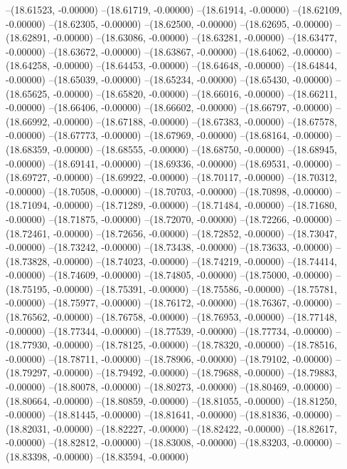 --(18.61523, -0.00000)
--(18.61719, -0.00000)
--(18.61914, -0.00000)
--(18.62109, -0.00000)
--(18.62305, -0.00000)
--(18.62500, -0.00000)
--(18.62695, -0.00000)
--(18.62891, -0.00000)
--(18.63086, -0.00000)
--(18.63281, -0.00000)
--(18.63477, -0.00000)
--(18.63672, -0.00000)
--(18.63867, -0.00000)
--(18.64062, -0.00000)
--(18.64258, -0.00000)
--(18.64453, -0.00000)
--(18.64648, -0.00000)
--(18.64844, -0.00000)
--(18.65039, -0.00000)
--(18.65234, -0.00000)
--(18.65430, -0.00000)
--(18.65625, -0.00000)
--(18.65820, -0.00000)
--(18.66016, -0.00000)
--(18.66211, -0.00000)
--(18.66406, -0.00000)
--(18.66602, -0.00000)
--(18.66797, -0.00000)
--(18.66992, -0.00000)
--(18.67188, -0.00000)
--(18.67383, -0.00000)
--(18.67578, -0.00000)
--(18.67773, -0.00000)
--(18.67969, -0.00000)
--(18.68164, -0.00000)
--(18.68359, -0.00000)
--(18.68555, -0.00000)
--(18.68750, -0.00000)
--(18.68945, -0.00000)
--(18.69141, -0.00000)
--(18.69336, -0.00000)
--(18.69531, -0.00000)
--(18.69727, -0.00000)
--(18.69922, -0.00000)
--(18.70117, -0.00000)
--(18.70312, -0.00000)
--(18.70508, -0.00000)
--(18.70703, -0.00000)
--(18.70898, -0.00000)
--(18.71094, -0.00000)
--(18.71289, -0.00000)
--(18.71484, -0.00000)
--(18.71680, -0.00000)
--(18.71875, -0.00000)
--(18.72070, -0.00000)
--(18.72266, -0.00000)
--(18.72461, -0.00000)
--(18.72656, -0.00000)
--(18.72852, -0.00000)
--(18.73047, -0.00000)
--(18.73242, -0.00000)
--(18.73438, -0.00000)
--(18.73633, -0.00000)
--(18.73828, -0.00000)
--(18.74023, -0.00000)
--(18.74219, -0.00000)
--(18.74414, -0.00000)
--(18.74609, -0.00000)
--(18.74805, -0.00000)
--(18.75000, -0.00000)
--(18.75195, -0.00000)
--(18.75391, -0.00000)
--(18.75586, -0.00000)
--(18.75781, -0.00000)
--(18.75977, -0.00000)
--(18.76172, -0.00000)
--(18.76367, -0.00000)
--(18.76562, -0.00000)
--(18.76758, -0.00000)
--(18.76953, -0.00000)
--(18.77148, -0.00000)
--(18.77344, -0.00000)
--(18.77539, -0.00000)
--(18.77734, -0.00000)
--(18.77930, -0.00000)
--(18.78125, -0.00000)
--(18.78320, -0.00000)
--(18.78516, -0.00000)
--(18.78711, -0.00000)
--(18.78906, -0.00000)
--(18.79102, -0.00000)
--(18.79297, -0.00000)
--(18.79492, -0.00000)
--(18.79688, -0.00000)
--(18.79883, -0.00000)
--(18.80078, -0.00000)
--(18.80273, -0.00000)
--(18.80469, -0.00000)
--(18.80664, -0.00000)
--(18.80859, -0.00000)
--(18.81055, -0.00000)
--(18.81250, -0.00000)
--(18.81445, -0.00000)
--(18.81641, -0.00000)
--(18.81836, -0.00000)
--(18.82031, -0.00000)
--(18.82227, -0.00000)
--(18.82422, -0.00000)
--(18.82617, -0.00000)
--(18.82812, -0.00000)
--(18.83008, -0.00000)
--(18.83203, -0.00000)
--(18.83398, -0.00000)
--(18.83594, -0.00000)
